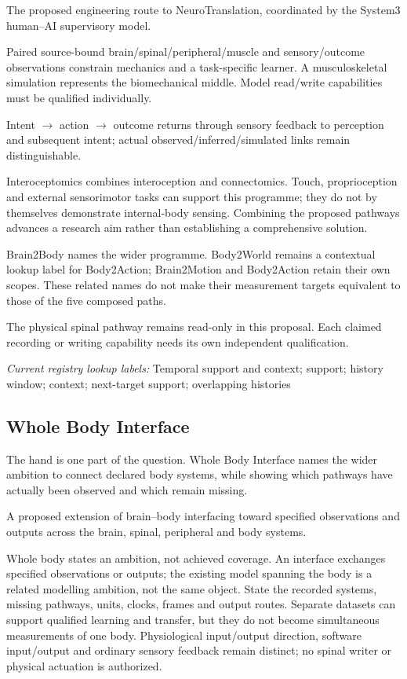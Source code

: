 \noindent The proposed engineering route to NeuroTranslation, coordinated by the System3 human–AI supervisory model.\par
\noindent Paired source-bound brain/spinal/peripheral/muscle and sensory/outcome observations constrain mechanics and a task-specific learner. A musculoskeletal simulation represents the biomechanical middle. Model read/write capabilities must be qualified individually.\par
\noindent Intent \texorpdfstring{\ensuremath{\rightarrow}}{->} action \texorpdfstring{\ensuremath{\rightarrow}}{->} outcome returns through sensory feedback to perception and subsequent intent; actual observed/inferred/simulated links remain distinguishable.\par
\noindent Interoceptomics combines interoception and connectomics. Touch, proprioception and external sensorimotor tasks can support this programme; they do not by themselves demonstrate internal-body sensing. Combining the proposed pathways advances a research aim rather than establishing a comprehensive solution.\par
\noindent Brain2Body names the wider programme. Body2World remains a contextual lookup label for Body2Action; Brain2Motion and Body2Action retain their own scopes. These related names do not make their measurement targets equivalent to those of the five composed paths.\par
\noindent The physical spinal pathway remains read-only in this proposal. Each claimed recording or writing capability needs its own independent qualification.\par

\noindent\textit{Current registry lookup labels:} Temporal support and context; support; history window; context; next-target support; overlapping histories\par

\subsection*{Whole Body Interface}
\noindent The hand is one part of the question. Whole Body Interface names the wider ambition to connect declared body systems, while showing which pathways have actually been observed and which remain missing.\par
\noindent A proposed extension of brain–body interfacing toward specified observations and outputs across the brain, spinal, peripheral and body systems.\par
\noindent Whole body states an ambition, not achieved coverage. An interface exchanges specified observations or outputs; the existing model spanning the body is a related modelling ambition, not the same object. State the recorded systems, missing pathways, units, clocks, frames and output routes. Separate datasets can support qualified learning and transfer, but they do not become simultaneous measurements of one body. Physiological input/output direction, software input/output and ordinary sensory feedback remain distinct; no spinal writer or physical actuation is authorized.\par



